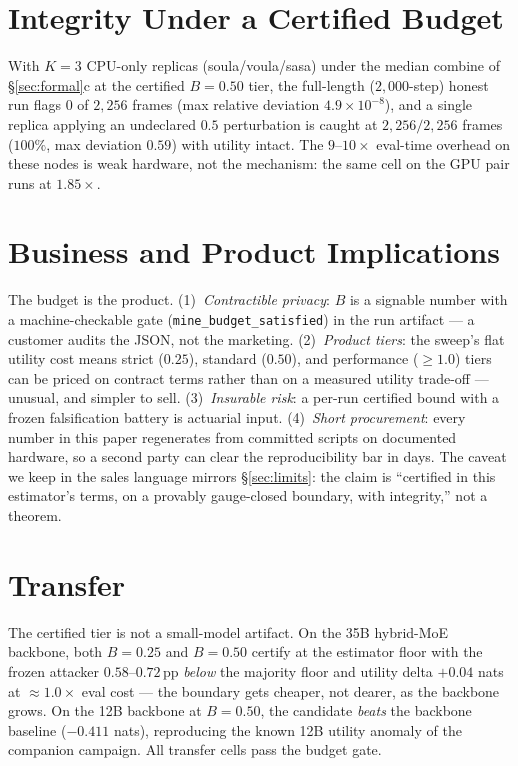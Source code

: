 \documentclass[10pt]{article}
\begin{document}
\section{Integrity Under a Certified Budget}
\label{sec:integrity}

With $K{=}3$ CPU-only replicas (soula/voula/sasa) under the median
combine of \S\ref{sec:formal}c at the certified $B{=}0.50$ tier, the
full-length ($2{,}000$-step) honest run flags $0$ of $2{,}256$ frames
(max relative deviation $4.9\!\times\!10^{-8}$), and a single replica
applying an undeclared $0.5$ perturbation is caught at $2{,}256/2{,}256$
frames ($100\%$, max deviation $0.59$) with utility intact.  The
$9$–$10\times$ eval-time overhead on these nodes is weak hardware, not
the mechanism: the same cell on the GPU pair runs at $1.85\times$.

\section{Business and Product Implications}
\label{sec:business}

The budget is the product.  (1)~\emph{Contractible privacy}: $B$ is a
signable number with a machine-checkable gate
(\texttt{mine\_budget\_satisfied}) in the run artifact — a customer
audits the JSON, not the marketing.  (2)~\emph{Product tiers}: the
sweep's flat utility cost means strict ($0.25$), standard ($0.50$), and
performance ($\ge 1.0$) tiers can be priced on contract terms rather than
on a measured utility trade-off — unusual, and simpler to sell.
(3)~\emph{Insurable risk}: a per-run certified bound with a frozen
falsification battery is actuarial input.  (4)~\emph{Short procurement}:
every number in this paper regenerates from committed scripts on
documented hardware, so a second party can clear the reproducibility bar
in days.  The caveat we keep in the sales language mirrors
\S\ref{sec:limits}: the claim is ``certified in this estimator's terms,
on a provably gauge-closed boundary, with integrity,'' not a theorem.

\section{Transfer}
\label{sec:transfer}

The certified tier is not a small-model artifact.  On the 35B hybrid-MoE
backbone, both $B{=}0.25$ and $B{=}0.50$ certify at the estimator floor
with the frozen attacker $0.58$–$0.72$\,pp \emph{below} the majority
floor and utility delta $+0.04$ nats at $\approx 1.0\times$ eval cost —
the boundary gets cheaper, not dearer, as the backbone grows.  On the 12B
backbone at $B{=}0.50$, the candidate \emph{beats} the backbone baseline
($-0.411$ nats), reproducing the known 12B utility anomaly of the
companion campaign.  All transfer cells pass the budget gate.
\end{document}
